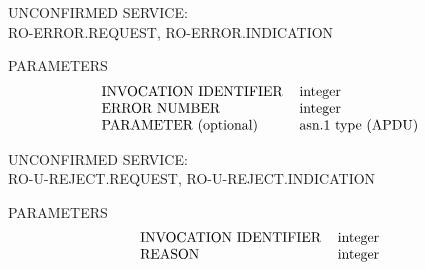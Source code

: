 

\begin{bwslide}

\begin{nrtc}
\item   UNCONFIRMED SERVICE:\\ RO-ERROR.REQUEST, RO-ERROR.INDICATION

\item   PARAMETERS
\[\begin{tabular}{ll}
    INVOCATION IDENTIFIER&      integer\\
    ERROR NUMBER&               integer\\
    PARAMETER (optional)&       asn.1 type (APDU)
\end{tabular}\]
\end{nrtc}
\end{bwslide}




\begin{bwslide}

\begin{nrtc}
\item   UNCONFIRMED SERVICE:\\ RO-U-REJECT.REQUEST, RO-U-REJECT.INDICATION

\item   PARAMETERS
\[\begin{tabular}{ll}
    INVOCATION IDENTIFIER&      integer\\
    REASON&                     integer
\end{tabular}\]
\end{nrtc}
\end{bwslide}




